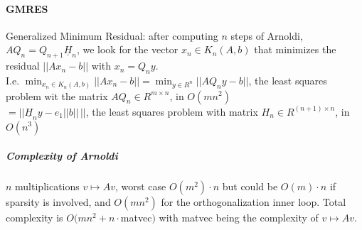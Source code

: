\documentclass[10pt]{report}
\begin{document}
\paragraph{GMRES} Generalized Minimum Residual: after computing $n$ steps of Arnoldi, $AQ_n = Q_{n+1}\underline{H}_n$, we look for the vector $x_n\in K_n(A,b)$ that minimizes the residual $||Ax_n-b||$ with $x_n = Q_ny$.\\
I.e. $\min_{x_n\in K_n(A,b)}||Ax_n-b|| = \min_{y\in R^n} ||AQ_ny -b||$, the least squares problem wit the matrix $AQ_n\in R^{m\times n}$, in $O(mn^2)$\\
$= ||\underline{H}_n y - e_1||b||\,||$, the least squares problem with matrix $H_n\in R^{(n+1)\times n}$, in $O(n^3)$
\subparagraph{Complexity of Arnoldi} $n$ multiplications $v\mapsto Av$, worst case $O(m^2)\cdot n$ but could be $O(m)\cdot n$ if sparsity is involved, and $O(mn^2)$ for the orthogonalization inner loop. Total complexity is $O(mn^2+n\cdot$matvec$)$ with matvec being the complexity of $v\mapsto Av$.
\end{document}
